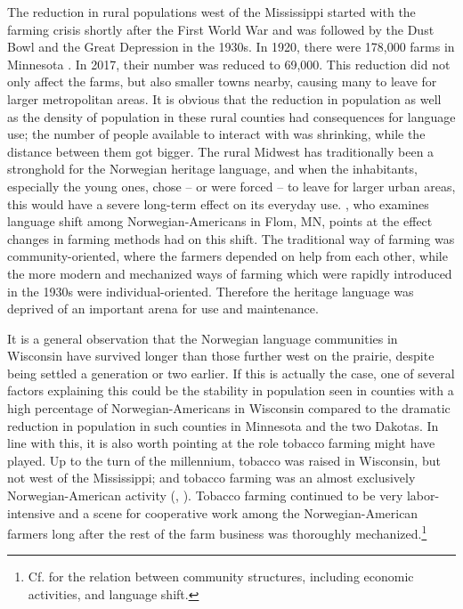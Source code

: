 \documentclass[output=paper]{langscibook}
\begin{document}
The reduction in rural populations west of the Mississippi started with the farming crisis shortly after the First World War and was followed by the Dust Bowl and the Great Depression in the 1930s. In 1920, there were 178,000 farms in Minnesota \citep[34]{Departmentofcommerce1922}. In 2017, their number was reduced to 69,000. This reduction did not only affect the farms, but also smaller towns nearby, causing many to leave for larger metropolitan areas. It is obvious that the reduction in population as well as the density of population in these rural counties had consequences for language use; the number of people available to interact with was shrinking, while the distance between them got bigger. The rural Midwest has traditionally been a stronghold for the Norwegian heritage language, and when the inhabitants, especially the young ones, chose – or were forced -- to leave for larger urban areas, this would have a severe long-term effect on 
its everyday use. \citet{Natvig2022}, who examines language shift among Norwegian\hyp Americans in Flom, MN, points at the effect changes in farming methods had on this shift. The traditional way of farming was community-oriented, where the farmers depended on help from each other, while the more modern and mechanized ways of farming which were rapidly introduced in the 1930s were individual-oriented. Therefore the heritage language was deprived of an important arena for use and maintenance.

It is a general observation that the Norwegian language communities in Wisconsin have survived longer than those further west on the prairie, despite being settled a generation or two earlier. If this is actually the case, one of several factors explaining this could be the stability in population seen in counties with a high percentage of Norwegian\hyp Americans in Wisconsin compared to the dramatic reduction in population in such counties in Minnesota and the two Dakotas. In line with this, it is also worth pointing at the role tobacco farming might have played. Up to the turn of the millennium, tobacco was raised in Wisconsin, but not west of the Mississippi; and tobacco farming was an almost exclusively Norwegian\hyp American activity (\citealt{StrickonIbarra1983}, \citealt{IbarraStrickon1989}). Tobacco farming continued to be very labor-intensive and a scene for cooperative work among the Norwegian\hyp American farmers long after the rest of the farm business was thoroughly mechanized.\footnote{Cf. \citet{Brown2022} for the relation between community structures, including economic activities, and language shift.} 
\end{document}

